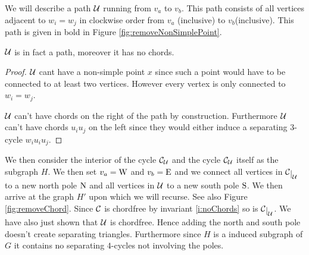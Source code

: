 We will describe a path $\mathcal{U}$ running from $v_a$ to $v_b$. This path consists of all vertices adjacent to $w_i = w_j$ in clockwise order from $v_a$ (inclusive) to $v_b$(inclusive). This path is given in bold in Figure \ref{fig:removeNonSimplePoint}.

\begin{lemma}
$\mathcal{U}$ is in fact a path, moreover it has no chords.
\end{lemma}
\begin{proof}
$\mathcal{U}$ cant have a non-simple point $x$ since such a point would have to be connected to at least two vertices. However every vertex is only connected to $w_i=w_j$.

$\mathcal{U}$ can't have chords on the right of the path by construction. Furthermore $\mathcal{U}$ can't have chords $u_i u_j$ on the left since they would either induce a separating $3$-cycle $w_i u_i u_j$.
\end{proof}


We then consider the interior of the cycle $\mathcal{C}_{\mathcal{U}}$ and the cycle $\mathcal{C}_{\mathcal{U}}$ itself as the subgraph $H$. We then set $v_a = \mathrm{W}$ and $v_b = \mathrm{E}$ and we connect all vertices in $\restC{\U}$ to a new north pole $\mathrm{N}$ and all vertices in $\mathcal{U}$ to a new south pole $\mathrm{S}$. We then arrive at the graph $H'$ upon which we will recurse. See also Figure \ref{fig:removeChord}. Since $\mathcal{C}$ is chordfree by invariant \ref{i:noChords} so is $\restC{\U}$. We have also just shown that $\mathcal{U}$ is chordfree. Hence adding the north and south pole doesn't create separating triangles. Furthermore since $H$ is a induced subgraph of $G$ it contains no separating $4$-cycles not involving the poles.


